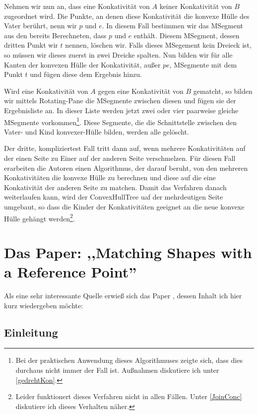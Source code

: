 Nehmen wir nun an, dass eine Konkativität von $A$ keiner Konkativität von $B$ zugeordnet wird. Die Punkte, an denen diese Konkativität die konvexe Hülle des Vater berührt, nenn wir $p$ und $e$. In diesem Fall bestimmen wir das MSegment aus den bereits Berechneten, dass $p$ und $e$ enthält. Diesem MSegment, dessen dritten Punkt wir $t$ nennen, löschen wir. Falls dieses MSegement kein Dreieck ist, so müssen wir dieses zuerst in zwei Dreicke spalten. Nun bilden wir für alle Kanten der konvexen Hülle der Konkativität, außer $pe$, MSegmente mit dem Punkt $t$ und fügen diese dem Ergebnis hinzu.

Wird eine Konkativität von $A$ gegen eine Konkativität von $B$ gematcht, so bilden wir mittels Rotating-Pane die MSegmente zwischen diesen und fügen sie der Ergebnisliste an. In dieser Liste werden jetzt zwei oder vier paarweise gleiche MSegmente vorkommen\footnote{Bei der praktischen Anwendung dieses Algorithmuses zeigte sich, dass dies durchaus nicht immer der Fall ist. Außnahmen diskutiere ich unter \ref{gedrehtKon}.}. Diese Segmente, die die Schnittstelle zwischen den Vater- und Kind konvexer-Hülle bilden, werden alle gelöscht. 

Der dritte, kompliziertest Fall tritt dann auf, wenn mehrere Konkativitäten auf der einen Seite zu Einer auf der anderen Seite verschmelzen. Für diesen Fall erarbeiten die Autoren einen Algorithmus, der darauf beruht, von den mehreren Konkativitäten die konvexe Hülle zu berechnen und diese auf die eine Konkativität der anderen Seite zu matchen. Damit das Verfahren danach weiterlaufen kann, wird der ConvexHullTree uaf der mehrdeutigen Seite umgebaut, so dass die Kinder der Konkativitäten geeignet an die neue konvexe Hülle gehängt werden\footnote{Leider funktionert dieses Verfahren nicht in allen Fällen. Unter \ref{JoinConc} diskutiere ich dieses Verhalten näher.}.

\section[Matching Shapes with a Reference Point]{Das Paper: ,,Matching Shapes with a Reference Point'' }\label{AARR}

Als eine sehr interessante Quelle erwieß sich das Paper \cite{AAR}, dessen Inhalt ich hier kurz wiedergeben möchte:

\subsection{Einleitung}


